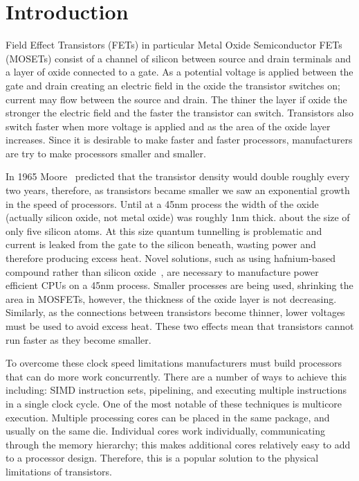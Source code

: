 %
%
\chapter{Introduction}
\label{chap:intro}



Field Effect Transistors (FETs) in particular Metal Oxide Semiconductor FETs
(MOSETs) consist of a channel of silicon between source and drain terminals and
a layer of oxide connected to a gate.
As a potential voltage is applied between the gate and drain creating an
electric field in the oxide
the transistor switches on;
current may flow between the source and drain.
The thiner the layer if oxide the stronger the electric field and the faster
the transistor can switch.
Transistors also switch faster when more voltage is applied
and as the area of the oxide layer increases.
Since it is desirable to make faster and faster processors,
manufacturers are try to make processors smaller and smaller.

In 1965 Moore~\cite{moore} predicted that the transistor 
density would double roughly every two years,
therefore, as transistors became smaller we saw an
exponential growth in the speed of processors.
Until at a 45nm process the width of the oxide
(actually silicon oxide, not metal oxide)
was roughly 1nm thick.
about the size of only five silicon atoms.
At this size quantum tunnelling is problematic and current is leaked from the
gate to the silicon beneath,
wasting power and therefore producing excess heat.
Novel solutions,
such as using hafnium-based compound rather than silicon
oxide~\cite{intel-high-k},
are necessary to manufacture power efficient CPUs on a 45nm process.
Smaller processes are being used, shrinking the area in MOSFETs,
however, the thickness of the oxide layer is not decreasing.
Similarly, as the connections between transistors become thinner,
lower voltages must be used to avoid excess heat.
These two effects mean that transistors cannot run faster as they become
smaller.

To overcome these clock speed limitations manufacturers must build processors
that can do more work concurrently.
There are a number of ways to achieve this including:
SIMD instruction sets,
pipelining,
and executing multiple instructions in a single clock cycle.
One of the most notable of these techniques is multicore execution.
Multiple processing cores can be placed in the same package,
and usually on the same die.
Individual cores work individually, communicating through the memory
hierarchy;
this makes additional cores relatively easy to add to a processor design.
Therefore, this is a popular solution to the physical limitations of
transistors.

